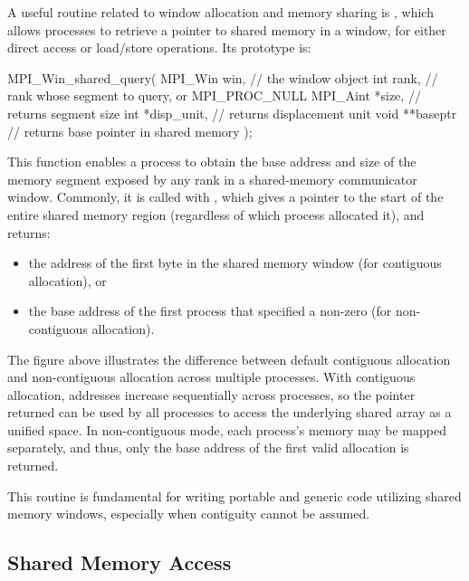 A useful routine related to window allocation and memory sharing is , which allows processes to retrieve a pointer to shared memory in a window, for either direct access or load/store operations. Its prototype is:

\begin{codeblock}[language=C]
MPI_Win_shared_query(
    MPI_Win   win,         // the window object
    int       rank,        // rank whose segment to query, or MPI_PROC_NULL
    MPI_Aint *size,        // returns segment size
    int      *disp_unit,   // returns displacement unit
    void    **baseptr      // returns base pointer in shared memory
);
\end{codeblock}

This function enables a process to obtain the base address and size of the memory segment exposed by any rank in a shared-memory communicator window. Commonly, it is called with , which gives a pointer to the start of the entire shared memory region (regardless of which process allocated it), and returns:

\begin{itemize}
    \item the address of the first byte in the shared memory window (for contiguous allocation), or
    \item the base address of the first process that specified a non-zero  (for non-contiguous allocation).
\end{itemize}


The figure above illustrates the difference between default contiguous allocation and non-contiguous allocation across multiple processes. With contiguous allocation, addresses increase sequentially across processes, so the pointer returned can be used by all processes to access the underlying shared array as a unified space. In non-contiguous mode, each process's memory may be mapped separately, and thus, only the base address of the first valid allocation is returned.

This routine is fundamental for writing portable and generic code utilizing shared memory windows, especially when contiguity cannot be assumed.

\subsection{Shared Memory Access}

